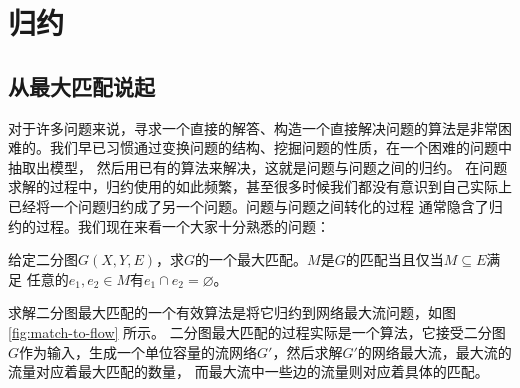 \chapter{归约}


\section{从最大匹配说起}

对于许多问题来说，寻求一个直接的解答、构造一个直接解决问题的算法是非常困难的。我们早已习惯通过变换问题的结构、挖掘问题的性质，在一个困难的问题中抽取出模型，
然后用已有的算法来解决，这就是问题与问题之间的归约。
在问题求解的过程中，归约使用的如此频繁，甚至很多时候我们都没有意识到自己实际上已经将一个问题归约成了另一个问题。问题与问题之间转化的过程
通常隐含了归约的过程。我们现在来看一个大家十分熟悉的问题：

\begin{prob}
 给定二分图$G(X,Y,E)$，求$G$的一个最大匹配。$M$是$G$的匹配当且仅当$M\subseteq E$满足
 任意的$e_1, e_2 \in M$有$e_1\cap e_2 = \varnothing$。
\end{prob}

求解二分图最大匹配的一个有效算法是将它归约到网络最大流问题，如图 \ref{fig:match-to-flow} 所示。
二分图最大匹配的过程实际是一个算法，它接受二分图$G$作为输入，生成一个单位容量的流网络$G'$，然后求解$G'$的网络最大流，最大流的流量对应着最大匹配的数量，
而最大流中一些边的流量则对应着具体的匹配。


